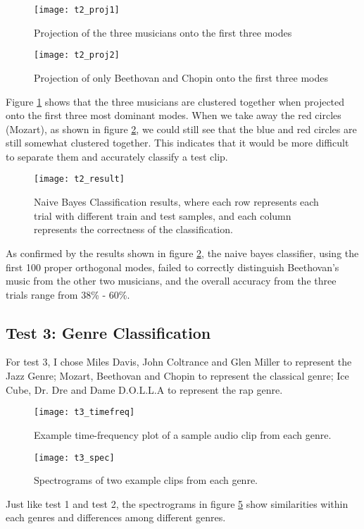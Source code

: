 \documentclass[12pt, a4paper]{article}
\begin{document}
\begin{figure}[H]
\centering
\texttt{[image: t2\_proj1]}
\caption{Projection of the three musicians onto the first three modes}
\label{fig:t24}
\end{figure}
\begin{figure}[H]
\centering
\texttt{[image: t2\_proj2]}
\caption{Projection of only Beethovan and Chopin onto the first three modes}
\label{fig:t25}
\end{figure}
Figure \ref{fig:t24} shows that the three musicians are clustered together when projected onto the first three most dominant modes. When we take away the red circles (Mozart), as shown in figure \ref{fig:t25}, we could still see that the blue and red circles are still somewhat clustered together. This indicates that it would be more difficult to separate them and accurately classify a test clip.
\begin{figure}[H]
\centering
\texttt{[image: t2\_result]}
\caption{Naive Bayes Classification results, where each row represents each trial with different train and test samples, and each column represents the correctness of the classification.}
\label{fig:t26}
\end{figure}
As confirmed by the results shown in figure \ref{fig:t25}, the naive bayes classifier, using the first 100 proper orthogonal modes, failed to correctly distinguish Beethovan's music from the other two musicians, and the overall accuracy from the three trials range from 38\% - 60\%.

\subsection{Test 3: Genre Classification}
For test 3, I chose Miles Davis, John Coltrance and Glen Miller to represent the Jazz Genre; Mozart, Beethovan and Chopin to represent the classical genre; Ice Cube, Dr. Dre and Dame D.O.L.L.A to represent the rap genre.

\begin{figure}[H]
\centering
\texttt{[image: t3\_timefreq]}
\caption{Example time-frequency plot of a sample audio clip from each genre.}
\label{fig:t31}
\end{figure}

\begin{figure}[H]
\centering
\texttt{[image: t3\_spec]}
\caption{Spectrograms of two example clips from each genre.}
\label{fig:t32}
\end{figure}
Just like test 1 and test 2, the spectrograms in  figure \ref{fig:t32} show similarities within each genres and differences among different genres. 
\end{document}
